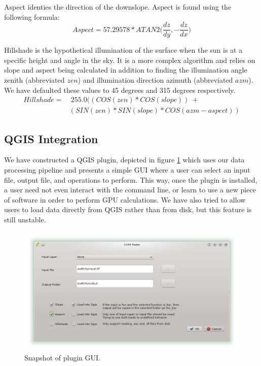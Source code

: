 \documentclass[journal]{IEEEtran}
\begin{document}
    Aspect identies the direction of the downslope. Aspect is found using
    the following formula:
    \[Aspect = 57.29578 * ATAN2\bigg(\frac{dz}{dy}, -\frac{dz}{dx}\bigg)\]

    Hillshade is the hypothetical illumination of the surface when the sun is
    at a specific height and angle in the sky. It is a more complex algorithm
    and relies on slope and aspect being calculated in addition to finding the
    illumination angle zenith (abbreviated \(zen\)) and illumination
    direction azimuth (abbreviated \(azm\)). We have defaulted these values
    to 45 degrees and 315 degrees respectively.
    \begin{align*}
        Hillshade =& ~ 255.0 ((COS(zen) * COS(slope)) ~ +  \\
                   &(SIN(zen) * SIN(slope) * COS(azm - aspect))
    \end{align*}

    \subsection{QGIS Integration}
    We have constructed a QGIS plugin, depicted in figure \ref{gui} which uses
    our data processing pipeline and presents a simple GUI where a user can
    select an input file, output file, and operations to perform. This way,
    once the plugin is installed, a user need not even interact with the
    command line, or learn to use a new piece of software in order to perform
    GPU calculations. We have also tried to allow users to load data directly
    from QGIS rather than from disk, but this feature is still unstable.
    \begin{figure}
        \includegraphics[width=\linewidth]{gui.png}
        \caption{Snapshot of plugin GUI.}
        \label{gui}
    \end{figure}
\usepackage{fancyvrb}
\end{document}
